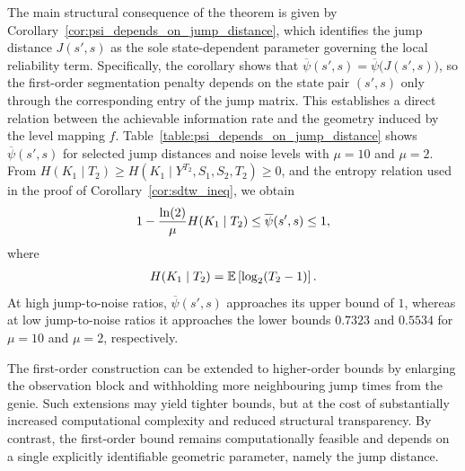 \documentclass[onecolumn]{IEEEtran}
\theoremstyle{definition}
\begin{document}
The main structural consequence of the theorem is given by Corollary~\ref{cor:psi_depends_on_jump_distance}, which identifies the jump distance $J(s',s)$ as the sole state-dependent parameter governing the local reliability term. Specifically, the corollary shows that $\overline{\psi}(s',s)=\overline{\psi}\bigl(J(s',s)\bigr)$, so the first-order segmentation penalty depends on the state pair $(s',s)$ only through the corresponding entry of the jump matrix. This establishes a direct relation between the achievable information rate and the geometry induced by the level mapping $f$. Table~\ref{table:psi_depends_on_jump_distance} shows \(\overline{\psi}(s',s)\) for selected jump distances and noise levels with \(\mu=10\) and \(\mu=2\). { From $H(K_1\mid T_2) \geq H(K_1\mid Y^{T_2},S_1,S_2,T_2) \geq 0$, and the entropy relation used in the proof of Corollary~\ref{cor:sdtw_ineq}, we obtain
\begin{align}
1-\frac{\ln(2)}{\mu}H(K_1\mid T_2)
\leq
\overline{\psi}(s',s)
\leq 1,\notag
\end{align}
where
\begin{align}
H(K_1\mid T_2)
=
\mathbb{E}\left[\log_2(T_2-1)\right].\notag
\end{align}
At high jump-to-noise ratios, \(\overline{\psi}(s',s)\) approaches its upper bound of \(1\), whereas at low jump-to-noise ratios it approaches the lower bounds \(0.7323\) and \(0.5534\) for \(\mu=10\) and \(\mu=2\), respectively.
}


{
The first-order construction can be extended to higher-order bounds by
enlarging the observation block and withholding more neighbouring jump times
from the genie. Such extensions may yield tighter bounds, but at the cost of
substantially increased computational complexity and reduced structural
transparency.}
By contrast, the first-order bound remains computationally feasible and depends
on a single explicitly identifiable geometric parameter, namely the jump
distance.
\end{document}
